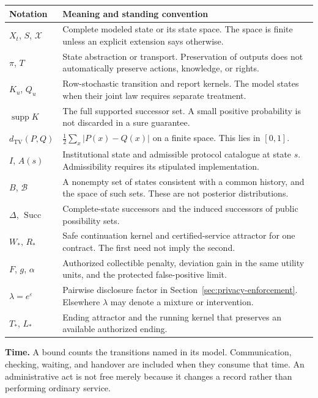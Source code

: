 \documentclass[11pt,letterpaper]{article}
\theoremstyle{plain}
\theoremstyle{definition}
\theoremstyle{remark}
\newcommand{\TV}{d_{\mathrm{TV}}}
\begin{document}
\begin{center}\small
\begin{tabularx}{\textwidth}{@{}p{}X@{}}
\toprule
Notation & Meaning and standing convention\\
\midrule
$X_t$, $S$, $\mathcal X$ & Complete modeled state or its state space. The space is finite unless an explicit extension says otherwise.\\
$\pi$, $T$ & State abstraction or transport. Preservation of outputs does not automatically preserve actions, knowledge, or rights.\\
$K_u$, $Q_u$ & Row-stochastic transition and report kernels. The model states when their joint law requires separate treatment.\\
$\operatorname{supp}K$ & The full supported successor set. A small positive probability is not discarded in a sure guarantee.\\
$\TV(P,Q)$ & $\tfrac12\sum_x|P(x)-Q(x)|$ on a finite space. This lies in $[0,1]$.\\
$I$, $A(s)$ & Institutional state and admissible protocol catalogue at state $s$. Admissibility requires its stipulated implementation.\\
$B$, $\mathcal B$ & A nonempty set of states consistent with a common history, and the space of such sets. These are not posterior distributions.\\
$\Delta$, $\operatorname{Succ}$ & Complete-state successors and the induced successors of public possibility sets.\\
$W_*$, $R_*$ & Safe continuation kernel and certified-service attractor for one contract. The first need not imply the second.\\
$F$, $g$, $\alpha$ & Authorized collectible penalty, deviation gain in the same utility units, and the protected false-positive limit.\\
$\lambda=e^\varepsilon$ & Pairwise disclosure factor in Section~\ref{sec:privacy-enforcement}. Elsewhere $\lambda$ may denote a mixture or intervention.\\
$T_*$, $L_*$ & Ending attractor and the running kernel that preserves an available authorized ending.\\
\bottomrule
\end{tabularx}
\end{center}

\noindent\textbf{Time.} A bound counts the transitions named in its model. Communication, checking, waiting, and handover are included when they consume that time. An administrative act is not free merely because it changes a record rather than performing ordinary service.
\end{document}
